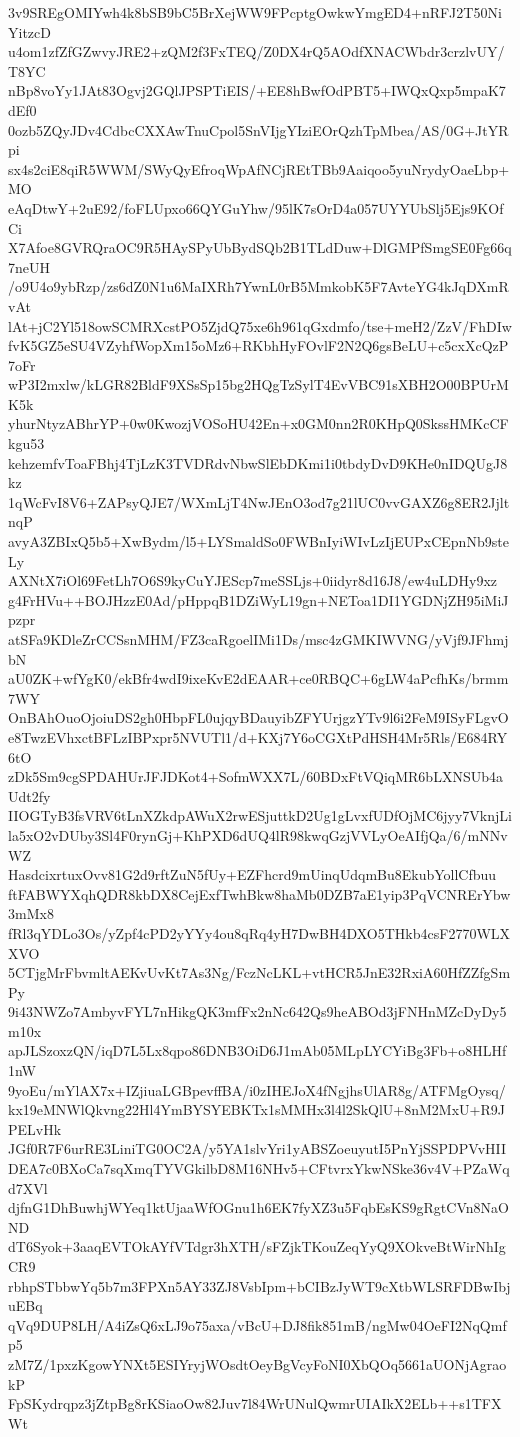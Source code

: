 3v9SREgOMIYwh4k8bSB9bC5BrXejWW9FPcptgOwkwYmgED4+nRFJ2T50NiYitzcD
u4om1zfZfGZwvyJRE2+zQM2f3FxTEQ/Z0DX4rQ5AOdfXNACWbdr3crzlvUY/T8YC
nBp8voYy1JAt83Ogvj2GQlJPSPTiEIS/+EE8hBwfOdPBT5+IWQxQxp5mpaK7dEf0
0ozb5ZQyJDv4CdbcCXXAwTnuCpol5SnVIjgYIziEOrQzhTpMbea/AS/0G+JtYRpi
sx4s2ciE8qiR5WWM/SWyQyEfroqWpAfNCjREtTBb9Aaiqoo5yuNrydyOaeLbp+MO
eAqDtwY+2uE92/foFLUpxo66QYGuYhw/95lK7sOrD4a057UYYUbSlj5Ejs9KOfCi
X7Afoe8GVRQraOC9R5HAySPyUbBydSQb2B1TLdDuw+DlGMPfSmgSE0Fg66q7neUH
/o9U4o9ybRzp/zs6dZ0N1u6MaIXRh7YwnL0rB5MmkobK5F7AvteYG4kJqDXmRvAt
lAt+jC2Yl518owSCMRXcstPO5ZjdQ75xe6h961qGxdmfo/tse+meH2/ZzV/FhDIw
fvK5GZ5eSU4VZyhfWopXm15oMz6+RKbhHyFOvlF2N2Q6gsBeLU+c5cxXcQzP7oFr
wP3I2mxlw/kLGR82BldF9XSsSp15bg2HQgTzSylT4EvVBC91sXBH2O00BPUrMK5k
yhurNtyzABhrYP+0w0KwozjVOSoHU42En+x0GM0nn2R0KHpQ0SkssHMKcCFkgu53
kehzemfvToaFBhj4TjLzK3TVDRdvNbwSlEbDKmi1i0tbdyDvD9KHe0nIDQUgJ8kz
1qWcFvI8V6+ZAPsyQJE7/WXmLjT4NwJEnO3od7g21lUC0vvGAXZ6g8ER2JjltnqP
avyA3ZBIxQ5b5+XwBydm/l5+LYSmaldSo0FWBnIyiWIvLzIjEUPxCEpnNb9steLy
AXNtX7iOl69FetLh7O6S9kyCuYJEScp7meSSLjs+0iidyr8d16J8/ew4uLDHy9xz
g4FrHVu++BOJHzzE0Ad/pHppqB1DZiWyL19gn+NEToa1DI1YGDNjZH95iMiJpzpr
atSFa9KDleZrCCSsnMHM/FZ3caRgoelIMi1Ds/msc4zGMKIWVNG/yVjf9JFhmjbN
aU0ZK+wfYgK0/ekBfr4wdI9ixeKvE2dEAAR+ce0RBQC+6gLW4aPcfhKs/brmm7WY
OnBAhOuoOjoiuDS2gh0HbpFL0ujqyBDauyibZFYUrjgzYTv9l6i2FeM9ISyFLgvO
e8TwzEVhxctBFLzIBPxpr5NVUTl1/d+KXj7Y6oCGXtPdHSH4Mr5Rls/E684RY6tO
zDk5Sm9cgSPDAHUrJFJDKot4+SofmWXX7L/60BDxFtVQiqMR6bLXNSUb4aUdt2fy
IIOGTyB3fsVRV6tLnXZkdpAWuX2rwESjuttkD2Ug1gLvxfUDfOjMC6jyy7VknjLi
la5xO2vDUby3Sl4F0rynGj+KhPXD6dUQ4lR98kwqGzjVVLyOeAIfjQa/6/mNNvWZ
HasdcixrtuxOvv81G2d9rftZuN5fUy+EZFhcrd9mUinqUdqmBu8EkubYollCfbuu
ftFABWYXqhQDR8kbDX8CejExfTwhBkw8haMb0DZB7aE1yip3PqVCNRErYbw3mMx8
fRl3qYDLo3Os/yZpf4cPD2yYYy4ou8qRq4yH7DwBH4DXO5THkb4csF2770WLXXVO
5CTjgMrFbvmltAEKvUvKt7As3Ng/FczNcLKL+vtHCR5JnE32RxiA60HfZZfgSmPy
9i43NWZo7AmbyvFYL7nHikgQK3mfFx2nNc642Qs9heABOd3jFNHnMZcDyDy5m10x
apJLSzoxzQN/iqD7L5Lx8qpo86DNB3OiD6J1mAb05MLpLYCYiBg3Fb+o8HLHf1nW
9yoEu/mYlAX7x+IZjiuaLGBpevffBA/i0zIHEJoX4fNgjhsUlAR8g/ATFMgOysq/
kx19eMNWlQkvng22Hl4YmBYSYEBKTx1sMMHx3l4l2SkQlU+8nM2MxU+R9JPELvHk
JGf0R7F6urRE3LiniTG0OC2A/y5YA1slvYri1yABSZoeuyutI5PnYjSSPDPVvHII
DEA7c0BXoCa7sqXmqTYVGkilbD8M16NHv5+CFtvrxYkwNSke36v4V+PZaWqd7XVl
djfnG1DhBuwhjWYeq1ktUjaaWfOGnu1h6EK7fyXZ3u5FqbEsKS9gRgtCVn8NaOND
dT6Syok+3aaqEVTOkAYfVTdgr3hXTH/sFZjkTKouZeqYyQ9XOkveBtWirNhIgCR9
rbhpSTbbwYq5b7m3FPXn5AY33ZJ8VsbIpm+bCIBzJyWT9cXtbWLSRFDBwIbjuEBq
qVq9DUP8LH/A4iZsQ6xLJ9o75axa/vBcU+DJ8fik851mB/ngMw04OeFI2NqQmfp5
zM7Z/1pxzKgowYNXt5ESIYryjWOsdtOeyBgVcyFoNI0XbQOq5661aUONjAgraokP
FpSKydrqpz3jZtpBg8rKSiaoOw82Juv7l84WrUNulQwmrUIAIkX2ELb++s1TFXWt
